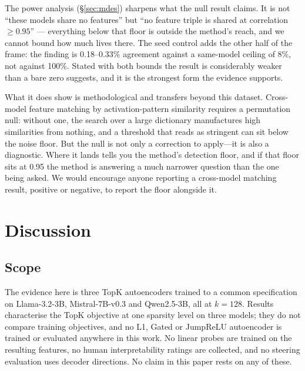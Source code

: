\documentclass[11pt]{article}
\begin{document}
The power analysis (\S\ref{sec:mdes}) sharpens what the null result claims. It is not
``these models share no features'' but ``no feature triple is shared at correlation
$\geq 0.95$'' --- everything below that floor is outside the method's reach, and we
cannot bound how much lives there. The seed control adds the other half of the frame:
the finding is 0.18--0.33\% agreement against a same-model ceiling of 8\%, not against
100\%. Stated with both bounds the result is considerably weaker than a bare zero
suggests, and it is the strongest form the evidence supports.

What it does show is methodological and transfers beyond this dataset. Cross-model
feature matching by activation-pattern similarity requires a permutation null: without
one, the search over a large dictionary manufactures high similarities from nothing, and
a threshold that reads as stringent can sit below the noise floor. But the null is not
only a correction to apply---it is also a diagnostic. Where it lands tells you the
method's detection floor, and if that floor sits at 0.95 the method is answering a much
narrower question than the one being asked. We would encourage anyone reporting a
cross-model matching result, positive or negative, to report the floor alongside it.

\section{Discussion}

\subsection{Scope}
\label{sec:scope}

The evidence here is three TopK autoencoders trained to a common specification on
Llama-3.2-3B, Mistral-7B-v0.3 and Qwen2.5-3B, all at $k = 128$. Results characterise
the TopK objective at one sparsity level on three models; they do not compare training
objectives, and no L1, Gated or JumpReLU autoencoder is trained or evaluated anywhere in
this work. No linear probes are trained on the resulting features, no human
interpretability ratings are collected, and no steering evaluation uses decoder
directions. No claim in this paper rests on any of these.


\label{sec:discussion}
\end{document}
